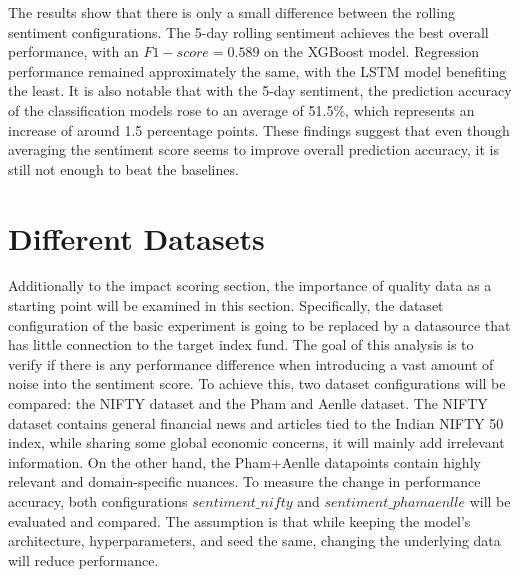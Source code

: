 \documentclass[Master,english,IEEE]{twbook}
\begin{document}
The results show that there is only a small difference between the rolling sentiment configurations. The 5-day rolling sentiment achieves the best overall performance, with an $F1-score = 0.589$ on the XGBoost model. Regression performance remained approximately the same, with the LSTM model benefiting the least. It is also notable that with the 5-day sentiment, the prediction accuracy of the classification models rose to an average of 51.5\%, which represents an increase of around 1.5 percentage points. These findings suggest that even though averaging the sentiment score seems to improve overall prediction accuracy, it is still not enough to beat the baselines.

\section{Different Datasets}
Additionally to the impact scoring section, the importance of quality data as a starting point will be examined in this section. Specifically, the dataset configuration of the basic experiment is going to be replaced by a datasource that has little connection to the target index fund. The goal of this analysis is to verify if there is any performance difference when introducing a vast amount of noise into the sentiment score. To achieve this, two dataset configurations will be compared: the NIFTY dataset and the Pham and Aenlle dataset. The NIFTY dataset contains general financial news and articles tied to the Indian NIFTY 50 index, while sharing some global economic concerns, it will mainly add irrelevant information. On the other hand, the Pham+Aenlle datapoints contain highly relevant and domain-specific nuances. To measure the change in performance accuracy, both configurations $sentiment\_nifty$ and $sentiment\_phamaenlle$ will be evaluated and compared. The assumption is that while keeping the model's architecture, hyperparameters, and seed the same, changing the underlying data will reduce performance.
\end{document}
